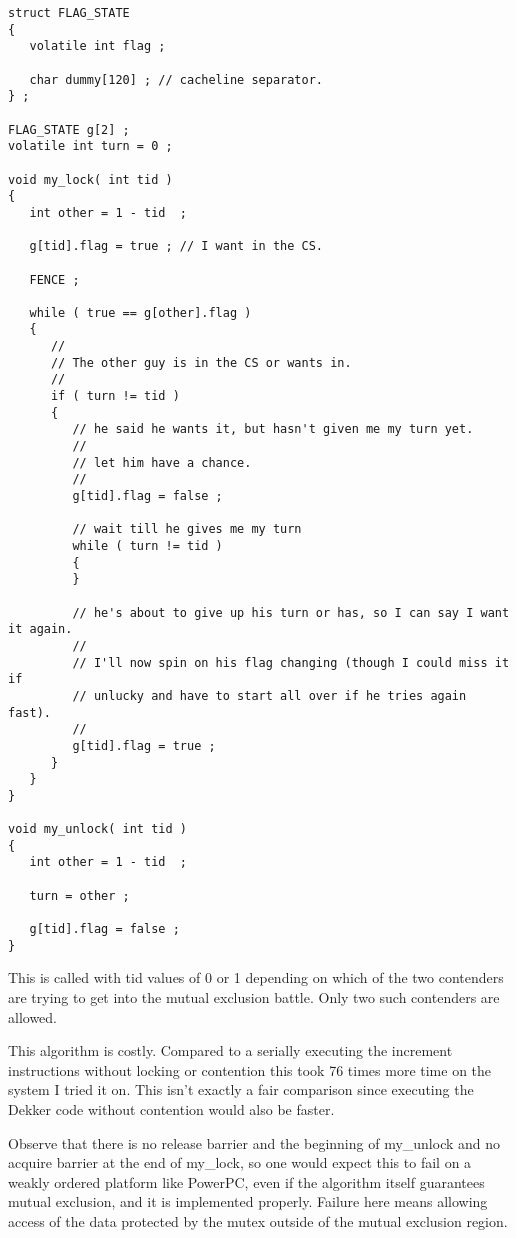 \begin{lstlisting}
struct FLAG_STATE
{
   volatile int flag ;

   char dummy[120] ; // cacheline separator.
} ;

FLAG_STATE g[2] ;
volatile int turn = 0 ;

void my_lock( int tid )
{
   int other = 1 - tid  ;

   g[tid].flag = true ; // I want in the CS.

   FENCE ;

   while ( true == g[other].flag )
   {
      //
      // The other guy is in the CS or wants in.
      //
      if ( turn != tid )
      {
         // he said he wants it, but hasn't given me my turn yet.
         //
         // let him have a chance.
         //
         g[tid].flag = false ;

         // wait till he gives me my turn
         while ( turn != tid )
         {
         }

         // he's about to give up his turn or has, so I can say I want it again.
         //
         // I'll now spin on his flag changing (though I could miss it if
         // unlucky and have to start all over if he tries again fast).
         //
         g[tid].flag = true ;
      }
   }
}

void my_unlock( int tid )
{
   int other = 1 - tid  ;

   turn = other ;

   g[tid].flag = false ;
}
\end{lstlisting}

This is called with tid values of 0 or 1 depending on which of the two contenders are trying to get into the mutual exclusion battle.  Only two such contenders are allowed.

This algorithm is costly.  Compared to a serially executing the increment instructions without locking or contention this took 76 times more time on the system I tried it on.  This isn't exactly a fair comparison since executing the Dekker code without contention would also be faster.

Observe that there is no release barrier and the beginning of my\_unlock and no acquire barrier at the end of my\_lock, so one would expect this to fail on a weakly ordered platform like PowerPC, even if the algorithm itself guarantees mutual exclusion, and it is implemented properly.  Failure here means allowing access of the data protected by the mutex outside of the mutual exclusion region.

